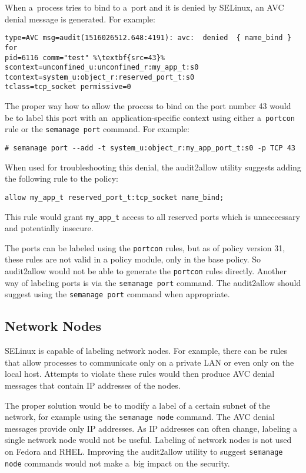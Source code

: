 When a~process tries to bind to a~port and it is denied by SELinux, an AVC
denial message is generated. For example:
\begin{lstlisting}[escapechar=\%]
type=AVC msg=audit(1516026512.648:4191): avc:  denied  { name_bind } for
pid=6116 comm="test" %\textbf{src=43}% scontext=unconfined_u:unconfined_r:my_app_t:s0
tcontext=system_u:object_r:reserved_port_t:s0
tclass=tcp_socket permissive=0
\end{lstlisting}

The proper way how to allow the process to bind on the port number 43 would be
to label this port with an~application-specific context using either
a~\texttt{portcon} rule or the \texttt{semanage port} command. For example:
\begin{lstlisting}
# semanage port --add -t system_u:object_r:my_app_port_t:s0 -p TCP 43
\end{lstlisting}

When used for troubleshooting this denial, the audit2allow utility suggests
adding the following rule to the policy:
\begin{lstlisting}[language=te]
allow my_app_t reserved_port_t:tcp_socket name_bind;
\end{lstlisting}
This rule would grant \texttt{my\_app\_t} access to all reserved ports which is
unneccessary and potentially insecure.

The ports can be labeled using the \texttt{portcon} rules, but as of policy
version 31, these rules are not valid in a policy module, only in the base
policy. So audit2allow would not be able to generate the \texttt{portcon} rules
directly.  Another way of labeling ports is via the \texttt{semanage port}
command. The audit2allow should suggest using the \texttt{semanage port} command
when appropriate.

\subsection{Network Nodes}
SELinux is capable of labeling network nodes. For example, there can be rules
that allow processes to communicate only on a private LAN or even only on the
local host. Attempts to violate these rules would then produce AVC denial
messages that contain IP addresses of the nodes.

The proper solution would be to modify a label of a certain subnet of the
network, for example using the \texttt{semanage node} command. The AVC denial
messages provide only IP addresses. As IP addresses can often change, labeling
a single network node would not be useful. Labeling of network nodes is not used
on Fedora and RHEL. Improving the audit2allow utility to suggest
\texttt{semanage node} commands would not make a~big impact on the security.

